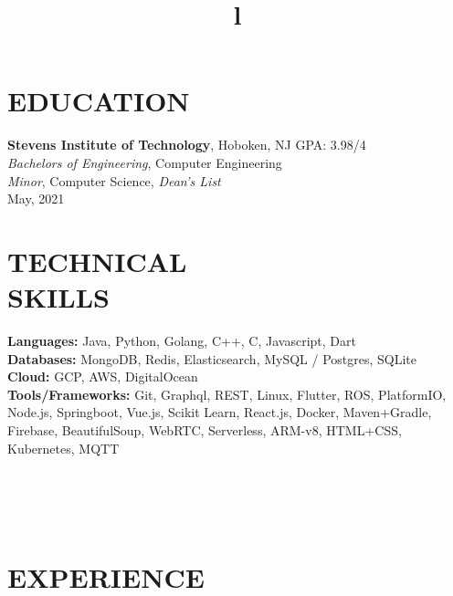\documentclass[margin]{res}
\begin{document}
\begin{resume}


\section{EDUCATION}
\textbf{Stevens Institute of Technology}, Hoboken, NJ \hfill GPA: 3.98/4\\
{\sl Bachelors of Engineering}, Computer Engineering\\
{\sl Minor}, Computer Science, {\sl Dean's List}\\
May, 2021

\section{TECHNICAL\\SKILLS}

\textbf{Languages:} Java, Python, Golang, C++, C, Javascript, Dart
\\
\textbf{Databases:} MongoDB, Redis, Elasticsearch, MySQL / Postgres, SQLite
\\
\textbf{Cloud:} GCP, AWS, DigitalOcean
\\
\textbf{Tools/Frameworks:} Git, Graphql, REST, Linux, Flutter, ROS, PlatformIO, Node.js,
Springboot, Vue.js, Scikit Learn, React.js, Docker, Maven+Gradle, Firebase, BeautifulSoup,
WebRTC, Serverless, ARM-v8, HTML+CSS, Kubernetes, MQTT

\begin{format}
\title{l}\\
\\
\body\\
\end{format}

\section{EXPERIENCE}


\end{resume}
\end{document}
